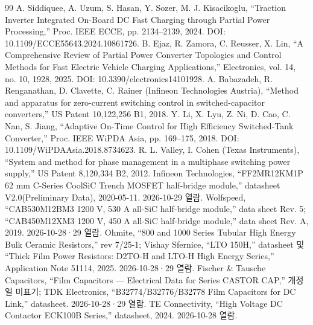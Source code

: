 \begin{thebibliography}{99}
 A. Siddiquee, A. Uzum, S. Hasan, Y. Sozer, M. J. Kisacikoglu, “Traction Inverter Integrated On-Board DC Fast Charging through Partial Power Processing,” Proc. IEEE ECCE, pp. 2134–2139, 2024. DOI: 10.1109/ECCE55643.2024.10861726.
 B. Ejaz, R. Zamora, C. Reusser, X. Lin, “A Comprehensive Review of Partial Power Converter Topologies and Control Methods for Fast Electric Vehicle Charging Applications,” Electronics, vol. 14, no. 10, 1928, 2025. DOI: 10.3390/electronics14101928.
 A. Babazadeh, R. Renganathan, D. Clavette, C. Rainer (Infineon Technologies Austria), “Method and apparatus for zero-current switching control in switched-capacitor converters,” US Patent 10,122,256 B1, 2018.
 Y. Li, X. Lyu, Z. Ni, D. Cao, C. Nan, S. Jiang, “Adaptive On-Time Control for High Efficiency Switched-Tank Converter,” Proc. IEEE WiPDA Asia, pp. 169–175, 2018. DOI: 10.1109/WiPDAAsia.2018.8734623.
 R. L. Valley, I. Cohen (Texas Instruments), “System and method for phase management in a multiphase switching power supply,” US Patent 8,120,334 B2, 2012.
 Infineon Technologies, “FF2MR12KM1P 62 mm C-Series CoolSiC Trench MOSFET half-bridge module,” datasheet V2.0(Preliminary Data), 2020-05-11. 2026-10-29 열람.
 Wolfspeed, “CAB530M12BM3 1200 V, 530 A all-SiC half-bridge module,” data sheet Rev. 5; “CAB450M12XM3 1200 V, 450 A all-SiC half-bridge module,” data sheet Rev. A, 2019. 2026-10-28·29 열람.
 Ohmite, “800 and 1000 Series Tubular High Energy Bulk Ceramic Resistors,” rev 7/25-1; Vishay Sfernice, “LTO 150H,” datasheet 및 “Thick Film Power Resistors: D2TO-H and LTO-H High Energy Series,” Application Note 51114, 2025. 2026-10-28·29 열람.
 Fischer \& Tausche Capacitors, “Film Capacitors — Electrical Data for Series CASTOR CAP,” 개정일 미표기; TDK Electronics, “B32774/B32776/B32778 Film Capacitors for DC Link,” datasheet. 2026-10-28·29 열람.
 TE Connectivity, “High Voltage DC Contactor ECK100B Series,” datasheet, 2024. 2026-10-28 열람.
\end{thebibliography}\endgroup
